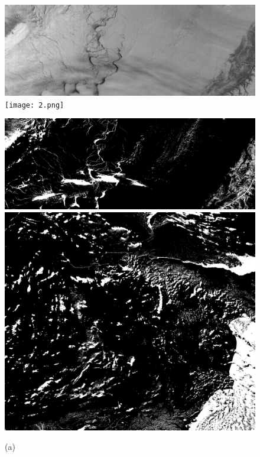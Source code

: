 \documentclass{article}
\begin{document}
        \begin{figure}[h]
            \centering
            \begin{minipage}{0.3\hsize}
                \centering
                \includegraphics[width = 1\hsize]{1.png}
                \texttt{[image: 2.png]}
                \caption*{(a)}
            \end{minipage}
            \begin{minipage}{0.3\hsize}
                \centering
                \includegraphics[width = 1\hsize]{1_kmeans.png}
                \includegraphics[width = 1\hsize]{2_kmeans.png}

\end{minipage}
\end{figure}
\end{document}
